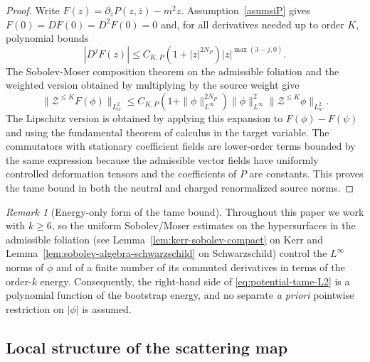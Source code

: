 \documentclass[11pt]{article}
\numberwithin{equation}{section}
\theoremstyle{plain}
\theoremstyle{definition}
\theoremstyle{remark}
\newtheorem{remark}{Remark}[section]
\begin{document}
\begin{proof}
Write $F(z)=\partial_{\bar z}P(z,\bar z)-m^2 z$. Assumption~\ref{asumsiP} gives $F(0)=DF(0)=D^2F(0)=0$ and, for all derivatives needed up to order $K$, polynomial bounds
\begin{equation}
|D^jF(z)|\le C_{K,P}(1+|z|^{2N_P})|z|^{\max(3-j,0)}.
\end{equation}
The Sobolev-Moser composition theorem on the admissible foliation and the weighted version obtained by multiplying by the source weight give
\begin{equation}
\|\mathcal Z^{\le K}F(\phi)\|_{L^2_w}
\le C_{K,P}(1+\|\phi\|_{L^\infty}^{2N_P})\|\phi\|_{L^\infty}^{2}\|\mathcal Z^{\le K}\phi\|_{L^2_w}.
\end{equation}
The Lipschitz version is obtained by applying this expansion to $F(\phi)-F(\psi)$ and using the fundamental theorem of calculus in the target variable. The commutators with stationary coefficient fields are lower-order terms bounded by the same expression because the admissible vector fields have uniformly controlled deformation tensors and the coefficients of $P$ are constants. This proves the tame bound in both the neutral and charged renormalized source norms.
\end{proof}

\begin{remark}[Energy-only form of the tame bound]\label{rem:potential-tame-energy}
Throughout this paper we work with $k\ge 6$, so the uniform Sobolev/Moser estimates on the hypersurfaces in the admissible foliation (see Lemma~\ref{lem:kerr-sobolev-compact} on Kerr and Lemma~\ref{lem:sobolev-algebra-schwarzschild} on Schwarzschild) control the $L^{\infty}$ norms of $\phi$ and of a finite number of its commuted derivatives in terms of the order-$k$ energy.
Consequently, the right-hand side of \eqref{eq:potential-tame-L2} is a polynomial function of the bootstrap energy, and no separate \emph{a priori} pointwise restriction on $|\phi|$ is assumed.
\end{remark}



\subsection{Local structure of the scattering map}\label{subsec:local-scattering-structure}
\end{document}
